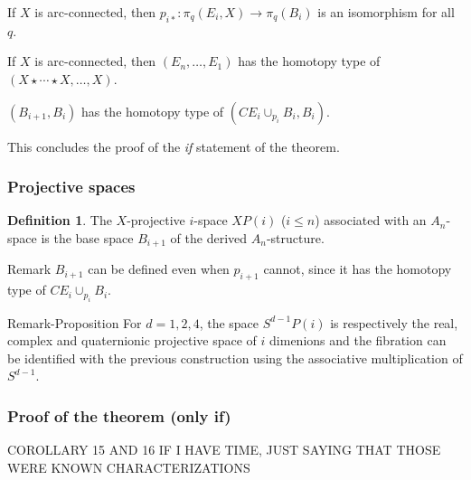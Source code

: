 \documentclass{beamer}
\theoremstyle{definition}
\newtheorem{defi}{Definition}
\begin{document}
\begin{frame}
\begin{theorem}
If $X$ is arc-connected, then $p_{i*}:\pi_q(E_i,X)\to \pi_q(B_i)$ is an isomorphism for all $q$. %
\end{theorem}\pause

\begin{theorem}
If $X$ is arc-connected, then $(E_n, \dots, E_1)$ has the homotopy type of $(X\star\cdots\star X,\dots, X)$. %
\end{theorem}\pause

\begin{theorem}
$(B_{i+1},B_i)$ has the homotopy type of $(CE_i\cup_{p_i}B_i,B_i)$. %
\end{theorem}\pause
This concludes the proof of the \emph{if} statement of the theorem.
\end{frame}
\begin{frame}
\frametitle{Projective spaces}
\begin{defi}
The $X$-projective $i$-space $XP(i)$ ($i\leq n$) associated with an $A_n$-space is the base space $B_{i+1}$ of the derived $A_n$-structure.
\end{defi}\pause
\begin{block}{Remark}
$B_{i+1}$ can be defined even when $p_{i+1}$ cannot, since it has the homotopy type of $CE_i\cup_{p_i}B_i$.
\end{block}\pause
\begin{block}{Remark-Proposition}%
For $d=1,2,4$, the space $S^{d-1}P(i)$ is respectively the real, complex and quaternionic projective space of $i$ dimenions and the fibration can be identified with the previous construction using the associative multiplication of $S^{d-1}$.
\end{block}
\end{frame}


\begin{frame}
\frametitle{Proof of the theorem (only if)}
\end{frame}




\begin{frame}
COROLLARY 15 AND 16 IF I HAVE TIME, JUST SAYING THAT THOSE WERE KNOWN CHARACTERIZATIONS
\end{frame}
\end{document}
